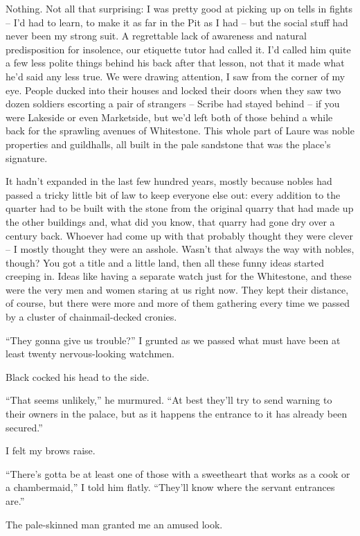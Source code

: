 \documentclass[12pt, openany]{book}
\begin{document}
Nothing. Not all that surprising: I was pretty good at picking up on tells in fights – I’d had to learn, to make it as far in the Pit as I had – but the social stuff had never been my strong suit. A regrettable lack of awareness and natural predisposition for insolence, our etiquette tutor had called it. I’d called him quite a few less polite things behind his back after that lesson, not that it made what he’d said any less true. We were drawing attention, I saw from the corner of my eye. People ducked into their houses and locked their doors when they saw two dozen soldiers escorting a pair of strangers – Scribe had stayed behind – if you were Lakeside or even Marketside, but we’d left both of those behind a while back for the sprawling avenues of Whitestone. This whole part of Laure was noble properties and guildhalls, all built in the pale sandstone that was the place’s signature. 

It hadn’t expanded in the last few hundred years, mostly because nobles had passed a tricky little bit of law to keep everyone else out: every addition to the quarter had to be built with the stone from the original quarry that had made up the other buildings and, what did you know, that quarry had gone dry over a century back. Whoever had come up with that probably thought they were clever – I mostly thought they were an asshole. Wasn’t that always the way with nobles, though? You got a title and a little land, then all these funny ideas started creeping in. Ideas like having a separate watch just for the Whitestone, and these were the very men and women staring at us right now. They kept their distance, of course, but there were more and more of them gathering every time we passed by a cluster of chainmail-decked cronies.

“They gonna give us trouble?” I grunted as we passed what must have been at least twenty nervous-looking watchmen.

Black cocked his head to the side.

“That seems unlikely,” he murmured. “At best they’ll try to send warning to their owners in the palace, but as it happens the entrance to it has already been secured.”

I felt my brows raise.

“There’s gotta be at least one of those with a sweetheart that works as a cook or a chambermaid,” I told him flatly. “They’ll know where the servant entrances are.”

The pale-skinned man granted me an amused look.
\end{document}
